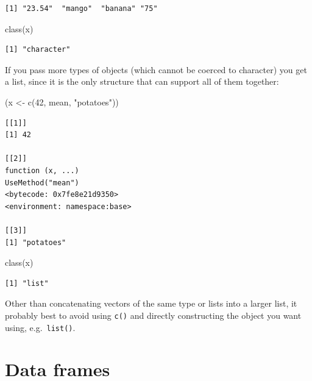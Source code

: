 \documentclass[
]{book}
\makeatletter
\newenvironment{Shaded}{\begin{snugshade}}{\end{snugshade}}
\newcommand{\DecValTok}[1]{\textcolor[rgb]{0.00,0.00,0.81}{#1}}
\newcommand{\FunctionTok}[1]{\textcolor[rgb]{0.00,0.00,0.00}{#1}}
\newcommand{\NormalTok}[1]{#1}
\newcommand{\OtherTok}[1]{\textcolor[rgb]{0.56,0.35,0.01}{#1}}
\newcommand{\StringTok}[1]{\textcolor[rgb]{0.31,0.60,0.02}{#1}}
\newenvironment{kframe}{%
\medskip{}
\setlength{\fboxsep}{.8em}
 \def\at@end@of@kframe{}%
 \ifinner\ifhmode%
  \def\at@end@of@kframe{\end{minipage}}%
  \begin{minipage}{\columnwidth}%
 \fi\fi%
 \def\FrameCommand##1{\hskip\@totalleftmargin \hskip-\fboxsep
 \colorbox{shadecolor}{##1}\hskip-\fboxsep
     \hskip-\linewidth \hskip-\@totalleftmargin \hskip\columnwidth}%
 \MakeFramed {\advance\hsize-\width
   \@totalleftmargin\z@ \linewidth\hsize
   \@setminipage}}%
 {\par\unskip\endMakeFramed%
 \at@end@of@kframe}
\newenvironment{rmdblock}[1]
  {
  \begin{itemize}
  \renewcommand{\labelitemi}{
    \raisebox{-.7\height}[0pt][0pt]{
      {\setkeys{Gin}{width=3em,keepaspectratio}\texttt{[image: images/\#1]}}
    }
  }
  \setlength{\fboxsep}{1em}
  \begin{kframe}
  \item
  }
  {
  \end{kframe}
  \end{itemize}
  }
\newenvironment{note}
  {\begin{rmdblock}{note}}
  {\end{rmdblock}}
\makeatother
\begin{document}
\begin{verbatim}
[1] "23.54"  "mango"  "banana" "75"    
\end{verbatim}

\begin{Shaded}
\begin{Highlighting}[]
\FunctionTok{class}\NormalTok{(x)}
\end{Highlighting}
\end{Shaded}

\begin{verbatim}
[1] "character"
\end{verbatim}

If you pass more types of objects (which cannot be coerced to character) you get a list, since it is the only structure that can support all of them together:

\begin{Shaded}
\begin{Highlighting}[]
\NormalTok{(x }\OtherTok{\textless{}{-}} \FunctionTok{c}\NormalTok{(}\DecValTok{42}\NormalTok{, mean, }\StringTok{"potatoes"}\NormalTok{))}
\end{Highlighting}
\end{Shaded}

\begin{verbatim}
[[1]]
[1] 42

[[2]]
function (x, ...) 
UseMethod("mean")
<bytecode: 0x7fe8e21d9350>
<environment: namespace:base>

[[3]]
[1] "potatoes"
\end{verbatim}

\begin{Shaded}
\begin{Highlighting}[]
\FunctionTok{class}\NormalTok{(x)}
\end{Highlighting}
\end{Shaded}

\begin{verbatim}
[1] "list"
\end{verbatim}

\begin{note}
Other than concatenating vectors of the same type or lists into a larger
list, it probably best to avoid using \texttt{c()} and directly
constructing the object you want using, e.g.~\texttt{list()}.
\end{note}

\hypertarget{data-frames}{%
\section{Data frames}\label{data-frames}}
\end{document}
